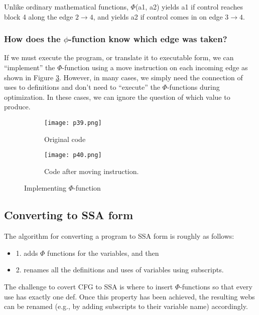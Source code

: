 Unlike ordinary mathematical functions, $\Phi$(a1, a2) yields a1 if control reaches block 4 along the edge $2 \rightarrow 4$, and yields a2 if control comes in on edge $3 \rightarrow 4$.


\subsubsection{How does the $\phi$-function know which edge was taken?}


If we must execute the program, or translate it to executable form, we can “implement” the $\Phi$-function using 
a move instruction on each incoming edge as shown in Figure \ref{fig:p39-40}. However, in many cases, we simply need the connection of uses to definitions and don’t need to “execute” the $\Phi$-functions during optimization. In these cases, we can ignore the question of which value to produce.

\begin{figure}[H]
	\centering
	\begin{subfigure}{0.3\textwidth}
		\centering
		\texttt{[image: p39.png]}
		\caption{Original code}
		\label{fig:p39}
	\end{subfigure}
	\begin{subfigure}{0.3\textwidth}
		\centering
		\texttt{[image: p40.png]}
		\caption{Code after moving instruction.}
		\label{fig:p40}
	\end{subfigure}
	\caption{Implementing $\Phi$-function}
	\label{fig:p39-40}
\end{figure}




\subsection{Converting to SSA form}

The algorithm for converting a program to SSA form is roughly as follows:

\begin{itemize}
	\item 1. adds $\Phi$ functions for the variables, and then
	\item 2. renames all the definitions and uses of variables using subscripts.
\end{itemize}




The challenge to covert CFG to SSA is where to insert $\Phi$-functions so that every use has exactly one def.
Once this property has been achieved, the resulting webs can be renamed (e.g., by adding subscripts to
their variable name) accordingly.

